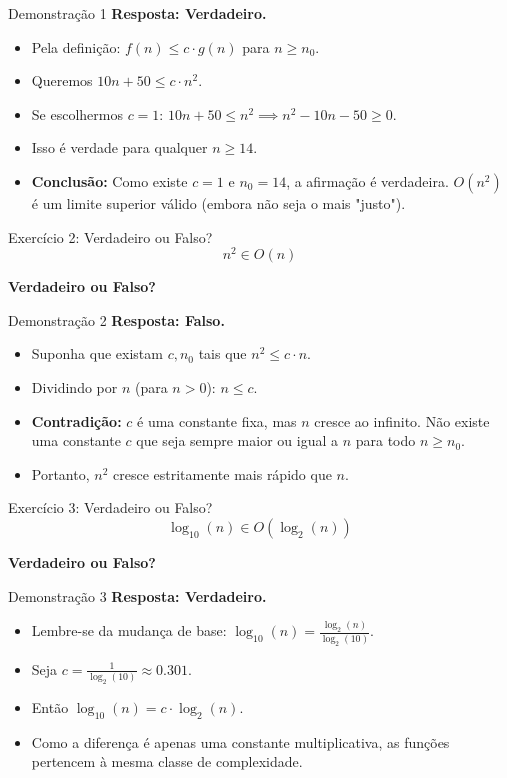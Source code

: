 \documentclass[aspectratio=169]{beamer}
\begin{document}
\begin{frame}{Demonstração 1}
    \textbf{Resposta: Verdadeiro.}
    \begin{itemize}
        \item Pela definição: $f(n) \le c \cdot g(n)$ para $n \ge n_0$.
        \item Queremos $10n + 50 \le c \cdot n^2$.
        \item Se escolhermos $c = 1$:
        $10n + 50 \le n^2 \implies n^2 - 10n - 50 \ge 0$.
        \item Isso é verdade para qualquer $n \ge 14$.
        \item \textbf{Conclusão:} Como existe $c=1$ e $n_0=14$, a afirmação é verdadeira. $O(n^2)$ é um limite superior válido (embora não seja o mais "justo").
    \end{itemize}
\end{frame}

\begin{frame}{Exercício 2: Verdadeiro ou Falso?}
    \Large
    \[ n^2 \in O(n) \]
    \begin{center}
        \textbf{Verdadeiro ou Falso?}
    \end{center}
\end{frame}

\begin{frame}{Demonstração 2}
    \textbf{Resposta: Falso.}
    \begin{itemize}
        \item Suponha que existam $c, n_0$ tais que $n^2 \le c \cdot n$.
        \item Dividindo por $n$ (para $n > 0$): $n \le c$.
        \item \textbf{Contradição:} $c$ é uma constante fixa, mas $n$ cresce ao infinito. Não existe uma constante $c$ que seja sempre maior ou igual a $n$ para todo $n \ge n_0$.
        \item Portanto, $n^2$ cresce estritamente mais rápido que $n$.
    \end{itemize}
\end{frame}

\begin{frame}{Exercício 3: Verdadeiro ou Falso?}
    \Large
    \[ \log_{10}(n) \in O(\log_{2}(n)) \]
    \begin{center}
        \textbf{Verdadeiro ou Falso?}
    \end{center}
\end{frame}

\begin{frame}{Demonstração 3}
    \textbf{Resposta: Verdadeiro.}
    \begin{itemize}
        \item Lembre-se da mudança de base: $\log_{10}(n) = \frac{\log_{2}(n)}{\log_{2}(10)}$.
        \item Seja $c = \frac{1}{\log_{2}(10)} \approx 0.301$.
        \item Então $\log_{10}(n) = c \cdot \log_{2}(n)$.
        \item Como a diferença é apenas uma constante multiplicativa, as funções pertencem à mesma classe de complexidade.
    \end{itemize}
\end{frame}
\end{document}
